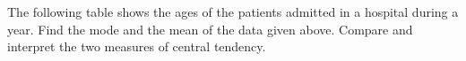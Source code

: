 \begin{flushleft}
The following table shows the ages of the patients admitted in a hospital during a year. Find the mode and the mean of the data given above. Compare and interpret the two measures of central tendency.
\end{flushleft}

\begin{table}[ht!]
\centering

\end{table} 

